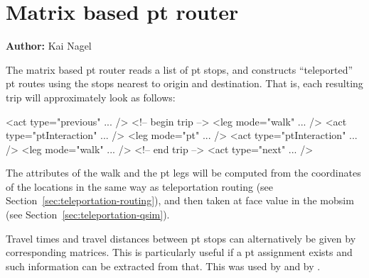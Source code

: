\chapter{Matrix based pt router}
\label{sec:matrix-based-pt-router}

\hfill \textbf{Author:} Kai Nagel




The matrix based \gls{pt} router reads a list of \gls{pt} stops, and constructs ``teleported'' \gls{pt} routes using the stops nearest to origin and destination.  That is, each resulting trip will approximately look as follows:
\begin{xml}
<act type="previous" ... />
<!-- begin trip -->
<leg mode="walk" ... />
<act type="ptInteraction" ... />
<leg mode="pt" ... />
<act type="ptInteraction" ... />
<leg mode="walk" ... />
<!-- end trip -->
<act type="next" ... />  
\end{xml}

The attributes of the walk and the \gls{pt} legs will be computed from the coordinates of the locations in the same way as teleportation routing (see Section~\ref{sec:teleportation-routing}), and then taken at face value in the \gls{mobsim} (see Section~\ref{sec:teleportation-qsim}).

Travel times and travel distances between \gls{pt} stops can alternatively be given by corresponding matrices.  This is particularly useful if a \gls{pt} assignment exists and such information can be extracted from that.  This was used by \citet{RoederNagel2013SketchPlanningBrussels} and by \citet{ZoelligRenner_PhDThesis_2014}.

